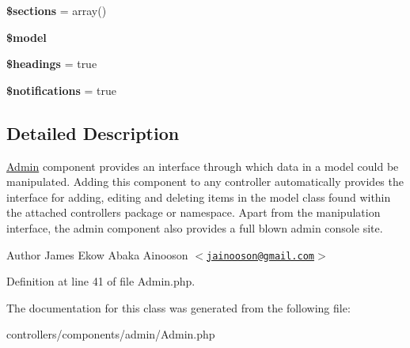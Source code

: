 \begin{DoxyCompactItemize}
\item 
\hypertarget{class_admin_aafcaf79ba938790cd370e47889bdff8b}{
{\bfseries \$sections} = array()}
\label{class_admin_aafcaf79ba938790cd370e47889bdff8b}

\item 
\hypertarget{class_admin_a6356aa71b8639f574f280f6c436613a9}{
{\bfseries \$model}}
\label{class_admin_a6356aa71b8639f574f280f6c436613a9}

\item 
\hypertarget{class_admin_a548c3e4a1f79669fcc8708fc9242922a}{
{\bfseries \$headings} = true}
\label{class_admin_a548c3e4a1f79669fcc8708fc9242922a}

\item 
\hypertarget{class_admin_a75d22be9c428bb7ee4db28407de9241b}{
{\bfseries \$notifications} = true}
\label{class_admin_a75d22be9c428bb7ee4db28407de9241b}

\end{DoxyCompactItemize}


\subsection{Detailed Description}
\hyperlink{class_admin}{Admin} component provides an interface through which data in a model could be manipulated. Adding this component to any controller automatically provides the interface for adding, editing and deleting items in the model class found within the attached controllers package or namespace. Apart from the manipulation interface, the admin component also provides a full blown admin console site.

\begin{DoxyAuthor}{Author}
James Ekow Abaka Ainooson $<$\href{mailto:jainooson@gmail.com}{\tt jainooson@gmail.com}$>$ 
\end{DoxyAuthor}


Definition at line 41 of file Admin.php.



The documentation for this class was generated from the following file:\begin{DoxyCompactItemize}
\item 
controllers/components/admin/Admin.php\end{DoxyCompactItemize}
